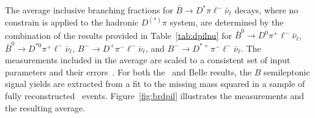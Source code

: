 The average inclusive branching fractions for $\bar{B} \to D^{*}\pi \ell^-\bar{\nu}_{\ell}$
decays, where no constrain is applied to the hadronic $D^{(*)}\pi$ system, 
are determined by the
combination of the results provided in Table~\ref{tab:dpilnu} for 
$\bar{B}^0 \to D^0 \pi^+ \ell^-\bar{\nu}_{\ell}$, $\bar{B}^0 \to D^{*0} \pi^+
\ell^-\bar{\nu}_{\ell}$, 
$B^- \to D^+ \pi^-
\ell^-\bar{\nu}_{\ell}$, and $B^- \to D^{*+} \pi^- \ell^-\bar{\nu}_{\ell}$.
The measurements included in the average 
are scaled to a consistent set of input
parameters and their errors~\cite{HFAG_sl:inputparams}.
For both the \babar\ and Belle results, the $B$ semileptonic signal yields are
 extracted from a fit to the missing mass squared in a sample of fully
 reconstructed \BB\ events.  
Figure~\ref{fig:brdpil} illustrates the measurements and the
resulting average.



